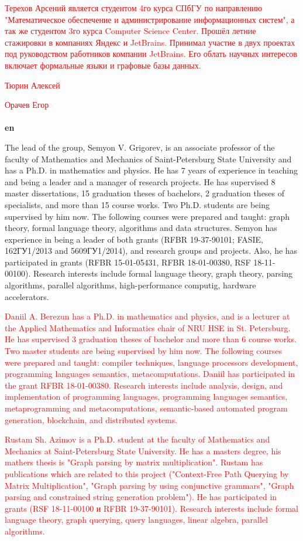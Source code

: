 \documentclass[12pt]{article}  %
\theoremstyle{remark}
\newcommand{\checkme}[1]{\textcolor{red}{#1}}
\begin{document}
\checkme{Терехов Арсений является студентом 4го курса СПбГУ по направлению "Математическое обеспечение и администрирование информационных систем", а так же студентом 3го курса Computer Science Center. Прошёл летние стажировки в компаниях Яндекс и JetBrains. Принимал участие в двух проектах под руководством работников компании JetBrains. Его облать научных интересов включает формальные языки и графовые базы данных.}


\checkme{Тюрин Алексей}

\checkme{Орачев Егор}
\\
\\
\textbf{en}

The lead of the group, Semyon V. Grigorev, is an associate professor of the faculty of Mathematics and Mechanics of Saint-Petersburg State University and has a Ph.D. in mathematics and physics. He has 7 years of experience in teaching and being a leader and a manager of research projects. He has supervised 8 master dissertations, 15 graduation theses of bachelors, 2 graduation theses of specialists, and more than 15 course works. Two Ph.D. students are being supervised by him now. The following courses were prepared and taught: graph theory, formal language theory, algorithms and data structures. Semyon has experience in being a leader of both grants  (RFBR 19-37-90101; FASIE, 162ГУ1/2013 and 5609ГУ1/2014), and research groups and projects. Also, he has participated in grants (RFBR 15-01-05431, RFBR 18-01-00380, RSF 18-11-00100). Research interests include formal language theory, graph theory, parsing algorithms, parallel algorithms, high-performance computig, hardware accelerators.

\checkme{Daniil A. Berezun has a Ph.D. in mathematics and physics, and is a lecturer at the Applied Mathematics and Informatics chair of NRU HSE in St. Petersburg. He has supervised 3 graduation theses of bachelor and more than 6 course works. Two master students are being supervised by him now. The following courses were prepared and taught: compiler techniques, language processors development, programming languages semantics, metacomputations. Daniil has participated in the grant RFBR 18-01-00380. Research interests include analysis, design, and implementation of programming languages, programming languages semantics, metaprogramming and metacomputations, semantic-based automated program generation, blockchain, and distributed systems.}

\checkme{Rustam Sh. Azimov is a Ph.D. student at the faculty of Mathematics and Mechanics at Saint-Petersburg State University. He has a masters degree, his mathers thesis is "Graph parsing by matrix multiplication". Rustam has publications which are related to this project ("Context-Free Path Querying by Matrix Multiplication", "Graph parsing by using conjunctive grammars", "Graph parsing and constrained string generation problem"). He has participated in grants (RSF 18-11-00100 и RFBR 19-37-90101). Research interests include formal language theory, graph querying, query languages, linear algebra, parallel algorithms.}
\end{document}
